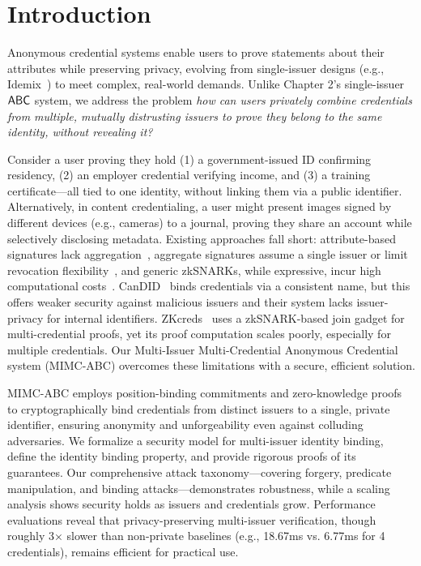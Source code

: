 \label{chap3}

\section{Introduction}\label{sec:mimc}
Anonymous credential systems enable users to prove statements about their attributes while preserving privacy, evolving from single-issuer designs (e.g., Idemix~\cite{camenisch_design_2002}) to meet complex, real-world demands. Unlike Chapter 2's single-issuer $\mathsf{ABC}$ system, we address the problem \emph{how can users privately combine credentials from multiple, mutually distrusting issuers to prove they belong to the same identity, without revealing it?}

Consider a user proving they hold (1) a government-issued ID confirming residency, (2) an employer credential verifying income, and (3) a training certificate—all tied to one identity, without linking them via a public identifier. Alternatively, in content credentialing, a user might present images signed by different devices (e.g., cameras) to a journal, proving they share an account while selectively disclosing metadata. Existing approaches fall short: attribute-based signatures lack aggregation~\cite{cimato_signature_2003}, aggregate signatures assume a single issuer \cite{goos_short_2001, hutchison_short_2004} or limit revocation flexibility~\cite{hebant_traceable_nodate}, and generic zkSNARKs, while expressive, incur high computational costs~\cite{rosenberg_zk-creds_2022}. CanDID~\cite{maram2021candid} binds credentials via a consistent name, but this offers weaker security against malicious issuers and their system lacks issuer-privacy for internal identifiers. ZKcreds~\cite{rosenberg_zk-creds_2022} uses a zkSNARK-based join gadget for multi-credential proofs, yet its proof computation scales poorly, especially for multiple credentials. Our Multi-Issuer Multi-Credential Anonymous Credential system (MIMC-ABC) overcomes these limitations with a secure, efficient solution.

MIMC-ABC employs position-binding commitments and zero-knowledge proofs to cryptographically bind credentials from distinct issuers to a single, private identifier, ensuring anonymity and unforgeability even against colluding adversaries. We formalize a security model for multi-issuer identity binding, define the identity binding property, and provide rigorous proofs of its guarantees. Our comprehensive attack taxonomy—covering forgery, predicate manipulation, and binding attacks—demonstrates robustness, while a scaling analysis shows security holds as issuers and credentials grow. Performance evaluations reveal that privacy-preserving multi-issuer verification, though roughly 3× slower than non-private baselines (e.g., 18.67ms vs. 6.77ms for 4 credentials), remains efficient for practical use.

